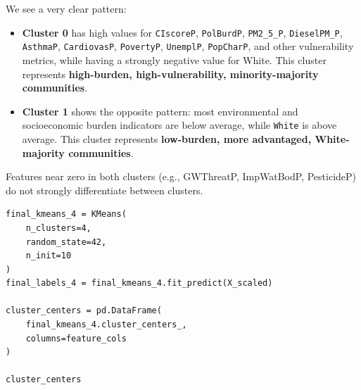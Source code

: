 \documentclass{article}
\begin{document}
We see a very clear pattern:

\begin{itemize}
\item \textbf{Cluster 0} has high values for \texttt{CIscoreP}, \texttt{PolBurdP}, \texttt{PM2\_5\_P}, \texttt{DieselPM\_P}, \texttt{AsthmaP}, \texttt{CardiovasP}, \texttt{PovertyP}, \texttt{UnemplP}, \texttt{PopCharP}, and other vulnerability metrics, while having a strongly negative value for White.\newline
\rightarrow This cluster represents \textbf{high-burden, high-vulnerability, minority-majority communities}.
\item \textbf{Cluster 1} shows the opposite pattern: most environmental and socioeconomic burden indicators are below average, while \texttt{White} is above average.\newline
\rightarrow This cluster represents \textbf{low-burden, more advantaged, White-majority communities}.
\end{itemize}

Features near zero in both clusters (e.g., GWThreatP, ImpWatBodP, PesticideP) do not strongly differentiate between clusters.

\begin{verbatim}
final_kmeans_4 = KMeans(
    n_clusters=4,
    random_state=42,
    n_init=10
)
final_labels_4 = final_kmeans_4.fit_predict(X_scaled)

cluster_centers = pd.DataFrame(
    final_kmeans_4.cluster_centers_,
    columns=feature_cols
)

cluster_centers
\end{verbatim}
\end{document}
